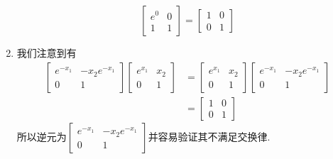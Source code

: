 \begin{solution}
\begin{enumerate}
		\begin{equation}
			\begin{bmatrix}e^0&0\\1&1\end{bmatrix}=\begin{bmatrix}1&0\\0&1\end{bmatrix}
		\end{equation}
		\item 我们注意到有
		\begin{equation}
			\begin{aligned}\begin{bmatrix}e^{-x_1}&-x_2e^{-x_1}\\0&1\end{bmatrix}\begin{bmatrix}e^{x_1}&x_2\\0&1\end{bmatrix}&=\begin{bmatrix}e^{x_1}&x_2\\0&1\end{bmatrix}\begin{bmatrix}e^{-x_1}&-x_2e^{-x_1}\\0&1\end{bmatrix}\\&=\begin{bmatrix}1&0\\0&1\end{bmatrix}\end{aligned}
		\end{equation}
		所以逆元为$\begin{bmatrix}e^{-x_1}&-x_2e^{-x_1}\\0&1\end{bmatrix}$并容易验证其不满足交换律.
	\end{enumerate}
\end{solution}
